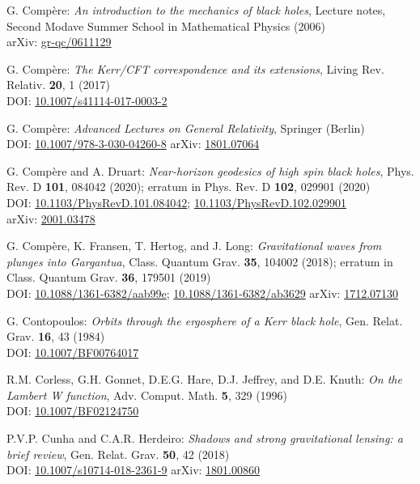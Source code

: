 \begin{thebibliography}{123}
G. Compère:
{\em An introduction to the mechanics of black holes},
Lecture notes, Second Modave Summer School in Mathematical Physics (2006)\\
arXiv: \href{https://arxiv.org/abs/gr-qc/0611129}{gr-qc/0611129}

G. Compère:
{\em The Kerr/CFT correspondence and its extensions},
Living Rev. Relativ. {\bf 20}, 1 (2017)\\
DOI: \href{https://doi.org/10.1007/s41114-017-0003-2}{10.1007/s41114-017-0003-2}

G. Compère:
{\em Advanced Lectures on General Relativity},
Springer (Berlin)\\
DOI: \href{https://doi.org/10.1007/978-3-030-04260-8}{10.1007/978-3-030-04260-8}\hfill
arXiv: \href{https://arxiv.org/abs/1801.07064}{1801.07064}

G. Compère and A. Druart:
{\em Near-horizon geodesics of high spin black holes},
Phys. Rev. D {\bf 101}, 084042 (2020); erratum in Phys. Rev. D {\bf 102}, 029901 (2020)\\
DOI: \href{https://doi.org/10.1103/PhysRevD.101.084042}{10.1103/PhysRevD.101.084042};
\href{https://doi.org/10.1103/PhysRevD.102.029901}{10.1103/PhysRevD.102.029901}\\
arXiv: \href{https://arxiv.org/abs/2001.03478}{2001.03478}

G. Compère, K. Fransen, T. Hertog, and J. Long:
{\em Gravitational waves from plunges into Gargantua},
Class. Quantum Grav. {\bf 35}, 104002 (2018);
erratum in Class. Quantum Grav. {\bf 36}, 179501 (2019) \\
DOI: \href{https://doi.org/10.1088/1361-6382/aab99e}{10.1088/1361-6382/aab99e};
\href{https://doi.org/10.1088/1361-6382/ab3629}{10.1088/1361-6382/ab3629}
\hfill
arXiv: \href{https://arxiv.org/abs/1712.07130}{1712.07130}

G. Contopoulos:
{\em Orbits through the ergosphere of a Kerr black hole},
Gen. Relat. Grav. {\bf 16}, 43 (1984)\\
DOI: \href{https://doi.org/10.1007/BF00764017}{10.1007/BF00764017}

R.M. Corless, G.H. Gonnet, D.E.G. Hare, D.J. Jeffrey, and D.E. Knuth:
{\em On the Lambert W function},
Adv. Comput. Math. {\bf 5}, 329 (1996)\\
DOI: \href{https://doi.org/10.1007/BF02124750}{10.1007/BF02124750}

P.V.P. Cunha and C.A.R. Herdeiro:
{\em Shadows and strong gravitational lensing: a brief review},
Gen. Relat. Grav. {\bf 50}, 42 (2018)\\
DOI: \href{https://doi.org/10.1007/s10714-018-2361-9}{10.1007/s10714-018-2361-9}\hfill
arXiv: \href{https://arxiv.org/abs/1801.00860}{1801.00860}


\end{thebibliography}
